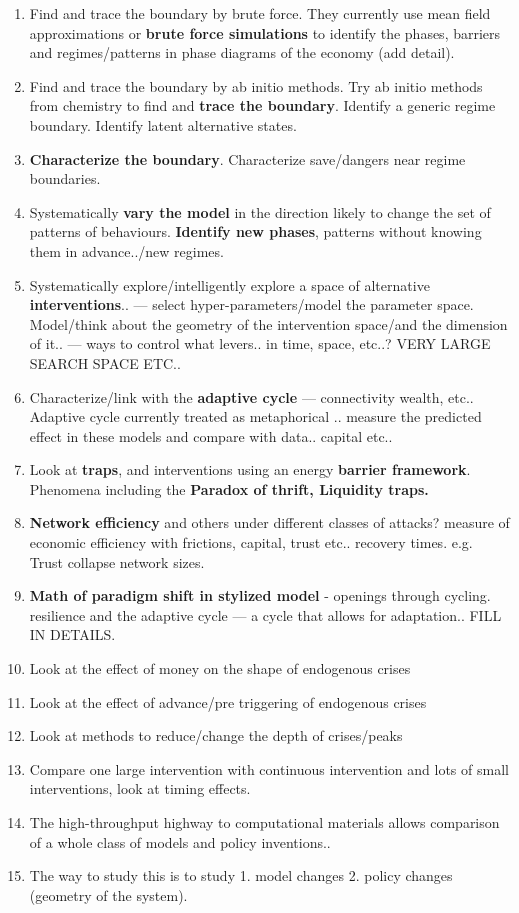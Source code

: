 \begin{enumerate}
\item Find and trace the boundary by brute force. They currently use mean field approximations or \textbf{brute force simulations} to identify the phases, barriers and regimes/patterns in phase diagrams of the economy (add detail).
\item Find and trace the boundary by ab initio methods. Try ab initio methods from chemistry to find and \textbf{trace the boundary}. Identify a generic regime boundary. Identify latent alternative states.
   \item \textbf{Characterize the boundary}. Characterize save/dangers near regime boundaries.
   \item Systematically \textbf{vary the model} in the direction likely to change the set of patterns of behaviours. \textbf{Identify new phases}, patterns without knowing them in advance../new regimes.
   \item Systematically explore/intelligently explore a space of alternative \textbf{interventions}.. — select hyper-parameters/model the parameter space. Model/think about the geometry of the intervention space/and the dimension of it.. — ways to control what levers.. in time, space, etc..? VERY LARGE SEARCH SPACE ETC..
   \item Characterize/link with the \textbf{adaptive cycle} — connectivity wealth, etc..
Adaptive cycle currently treated as metaphorical .. measure the predicted effect in these models and compare with data.. capital etc..
\item Look at \textbf{traps}, and interventions using an energy \textbf{barrier framework}.
Phenomena including the \textbf{Paradox of thrift, Liquidity traps.}
\item \textbf{Network efficiency} and others under different classes of attacks? measure of economic efficiency with frictions, capital, trust etc.. recovery times. e.g. Trust collapse network sizes.
\item \textbf{Math of paradigm shift in stylized model} - openings through cycling. resilience and the adaptive cycle — a cycle that allows for adaptation.. FILL IN DETAILS.


\item Look at the effect of money on the shape of endogenous crises
\item Look at the effect of advance/pre triggering of endogenous crises
\item Look at methods to reduce/change the depth of crises/peaks
\item Compare one large intervention with continuous intervention and lots of small interventions, look at timing effects.

\item The high-throughput highway to computational materials allows comparison of a whole class of models and policy inventions..

\item The way to study this is to study 1. model changes 2. policy changes (geometry of the system). 
\end{enumerate}





